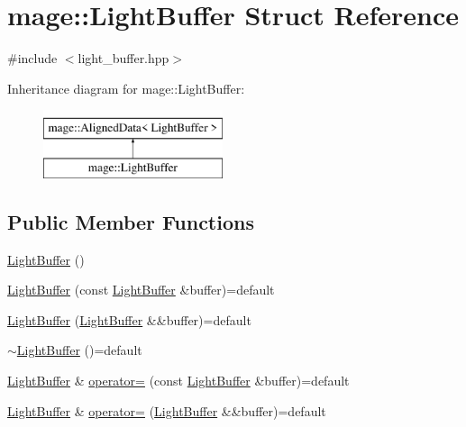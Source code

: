 \hypertarget{structmage_1_1_light_buffer}{}\section{mage\+:\+:Light\+Buffer Struct Reference}
\label{structmage_1_1_light_buffer}


{\ttfamily \#include $<$light\+\_\+buffer.\+hpp$>$}

Inheritance diagram for mage\+:\+:Light\+Buffer\+:\begin{figure}[H]
\begin{center}
\leavevmode
\includegraphics[height=2.000000cm]{structmage_1_1_light_buffer}
\end{center}
\end{figure}
\subsection*{Public Member Functions}
\begin{DoxyCompactItemize}
\item 
\hyperlink{structmage_1_1_light_buffer_a5ebb95f741d86b719ad25d56fac3ff66}{Light\+Buffer} ()
\item 
\hyperlink{structmage_1_1_light_buffer_a94aed51e6bdaf47c5f818f84b3e4edf4}{Light\+Buffer} (const \hyperlink{structmage_1_1_light_buffer}{Light\+Buffer} \&buffer)=default
\item 
\hyperlink{structmage_1_1_light_buffer_af0bb4f34aebc13b8cbd81e26fb8f6ecf}{Light\+Buffer} (\hyperlink{structmage_1_1_light_buffer}{Light\+Buffer} \&\&buffer)=default
\item 
\hyperlink{structmage_1_1_light_buffer_a0dc88c8ad1721b4b545c65c26c2fec69}{$\sim$\+Light\+Buffer} ()=default
\item 
\hyperlink{structmage_1_1_light_buffer}{Light\+Buffer} \& \hyperlink{structmage_1_1_light_buffer_ae3560a8dcda61fb02b86a370cd689e15}{operator=} (const \hyperlink{structmage_1_1_light_buffer}{Light\+Buffer} \&buffer)=default
\item 
\hyperlink{structmage_1_1_light_buffer}{Light\+Buffer} \& \hyperlink{structmage_1_1_light_buffer_a7a41e25c173b24a643e6a82a382c3c35}{operator=} (\hyperlink{structmage_1_1_light_buffer}{Light\+Buffer} \&\&buffer)=default
\end{DoxyCompactItemize}
